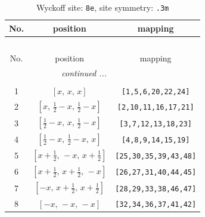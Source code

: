 \documentclass[fleqn,8pt]{jsarticle}
\begin{document}
\renewcommand{\arraystretch}{1.2}
\begin{longtable}{ccc}
\caption{Wyckoff site: {\tt 8e}, site symmetry: {\tt .3m}}
 \\
 \hline \hline
No. & position & mapping \\ \hline \endfirsthead

\multicolumn{2}{l}{\tablename\ \thetable{}} \\
 \hline \hline
No. & position & mapping \\ \hline \endhead

 \hline \hline
\multicolumn{2}{r}{\footnotesize\it continued ...} \\ \endfoot

 \hline \hline
\multicolumn{2}{r}{} \\ \endlastfoot

1 & $\left[ x,\, x,\, x \right]$ & {\tt [1,5,6,20,22,24]} \\ \hline
2 & $\left[ x,\, \frac{1}{2} - x,\, \frac{1}{2} - x \right]$ & {\tt [2,10,11,16,17,21]} \\ \hline
3 & $\left[ \frac{1}{2} - x,\, x,\, \frac{1}{2} - x \right]$ & {\tt [3,7,12,13,18,23]} \\ \hline
4 & $\left[ \frac{1}{2} - x,\, \frac{1}{2} - x,\, x \right]$ & {\tt [4,8,9,14,15,19]} \\ \hline
5 & $\left[ x + \frac{1}{2},\, - x,\, x + \frac{1}{2} \right]$ & {\tt [25,30,35,39,43,48]} \\ \hline
6 & $\left[ x + \frac{1}{2},\, x + \frac{1}{2},\, - x \right]$ & {\tt [26,27,31,40,44,45]} \\ \hline
7 & $\left[ - x,\, x + \frac{1}{2},\, x + \frac{1}{2} \right]$ & {\tt [28,29,33,38,46,47]} \\ \hline
8 & $\left[ - x,\, - x,\, - x \right]$ & {\tt [32,34,36,37,41,42]} \\
\end{longtable}
\renewcommand{\arraystretch}{1.2}
\end{document}
